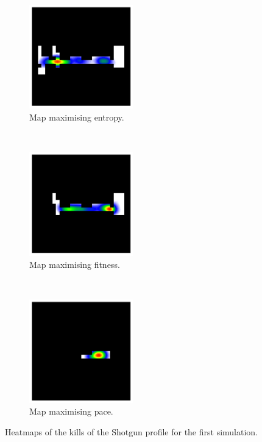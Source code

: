 \begin{figure}[H]
    \centering
    \begin{subfigure}[t]{0.3\textwidth}
        \centering
        \includegraphics[height=4.5cm]{Images/images/experiment_one/best_entropy_pop_0/kills_bot_0.png}
        \caption{Map maximising entropy.}
    \end{subfigure}%
    ~ 
    \begin{subfigure}[t]{0.3\textwidth}
        \centering
        \includegraphics[height=4.5cm]{Images/images/experiment_one/best_fitness_pop_0/kills_bot_0.png}
        \caption{Map maximising fitness.}
    \end{subfigure}
    ~ 
    \begin{subfigure}[t]{0.3\textwidth}
        \centering
        \includegraphics[height=4.5cm]{Images/images/experiment_one/best_pace_pop_0/kills_bot_0.png}
        \caption{Map maximising pace.}
    \end{subfigure}
    \caption{Heatmaps of the kills of the Shotgun profile for the first simulation.}
\end{figure}

